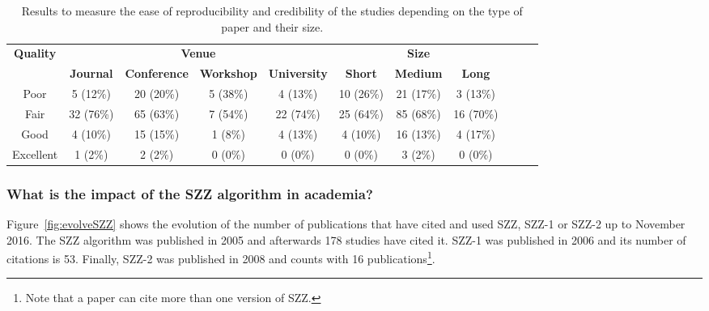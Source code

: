 \documentclass[a4paper, 12pt]{book}
\begin{document}

\begin{table}[h!]
\caption{Results to measure the ease of reproducibility and credibility of the studies depending on the type of paper and their size.}
\label{tableTypeSize}
  \centering
  \begin{adjustbox}{max width=\textwidth}
  \begin{tabular}{|c|c|c|c|c||c|c|c|c|c|c|}
  \hline
\multicolumn{1}{|c|}{\bfseries Quality} & \multicolumn{4}{|c||}{\bfseries Venue} & \multicolumn{3}{|c|}{\bfseries Size} \\
&\multicolumn{1}{|c|}{\bfseries Journal}&\multicolumn{1}{|c|}{\bfseries Conference}&\multicolumn{1}{|c|}{\bfseries Workshop}&\multicolumn{1}{|c||}{\bfseries University}&\multicolumn{1}{|c|}{\bfseries Short}&\multicolumn{1}{|c|}{\bfseries Medium}&\multicolumn{1}{|c|}{\bfseries Long}\\
  \hline
  \hline
  Poor & 5 (12\%)&20 (20\%)&5 (38\%)&4 (13\%)&10 (26\%) &21 (17\%)&3 (13\%)\\
\hline
Fair &32 (76\%)&65 (63\%)&7 (54\%)&22 (74\%)&25 (64\%) &85 (68\%)&16 (70\%)\\
\hline
Good &4 (10\%)&15 (15\%)&1 (8\%)&4 (13\%)&4 (10\%)&16 (13\%)&4 (17\%)\\
\hline
Excellent &1 (2\%)&2 (2\%)&0 (0\%)&0 (0\%)&0 (0\%)&3 (2\%)&0 (0\%)\\
\hline
\end{tabular}
\end{adjustbox}
\end{table}


\subsubsection{What is the impact of the SZZ algorithm in academia?}

Figure~\ref{fig:evolveSZZ} shows the evolution of the number of publications that have cited and used SZZ, SZZ-1 or SZZ-2 up to November 2016. The SZZ algorithm was published in 2005 and afterwards 178 studies have cited it. SZZ-1 was published in 2006 and its number of citations is 53. Finally, SZZ-2 was published in 2008 and counts with 16 publications\footnote{Note that a paper can cite more than one version of SZZ.}.
\end{document}
